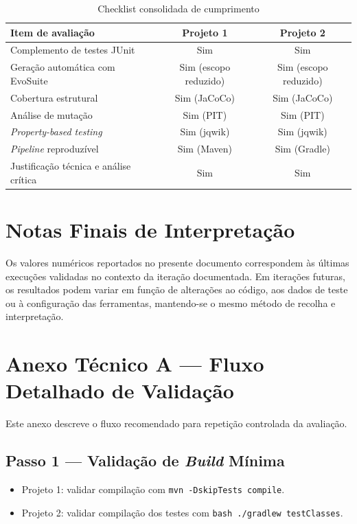 \documentclass{article}
\begin{document}
\begin{table}[H]
\centering
\begin{tabular}{p{}cc}
\toprule
Item de avaliação & Projeto 1 & Projeto 2 \\
\midrule
Complemento de testes JUnit & Sim & Sim \\
Geração automática com EvoSuite & Sim (escopo reduzido) & Sim (escopo reduzido) \\
Cobertura estrutural & Sim (JaCoCo) & Sim (JaCoCo) \\
Análise de mutação & Sim (PIT) & Sim (PIT) \\
\emph{Property-based testing} & Sim (jqwik) & Sim (jqwik) \\
\emph{Pipeline} reproduzível & Sim (Maven) & Sim (Gradle) \\
Justificação técnica e análise crítica & Sim & Sim \\
\bottomrule
\end{tabular}
\caption{Checklist consolidada de cumprimento}
\end{table}

\section{Notas Finais de Interpretação}

Os valores numéricos reportados no presente documento correspondem às últimas execuções validadas no contexto da iteração documentada. Em iterações futuras, os resultados podem variar em função de alterações ao código, aos dados de teste ou à configuração das ferramentas, mantendo-se o mesmo método de recolha e interpretação.

\section{Anexo Técnico A --- Fluxo Detalhado de Validação}

Este anexo descreve o fluxo recomendado para repetição controlada da avaliação.

\subsection{Passo 1 --- Validação de \emph{Build} Mínima}
\begin{itemize}
    \item Projeto 1: validar compilação com \texttt{mvn -DskipTests compile}.
    \item Projeto 2: validar compilação dos testes com \texttt{bash ./gradlew testClasses}.
\end{itemize}
\end{document}
